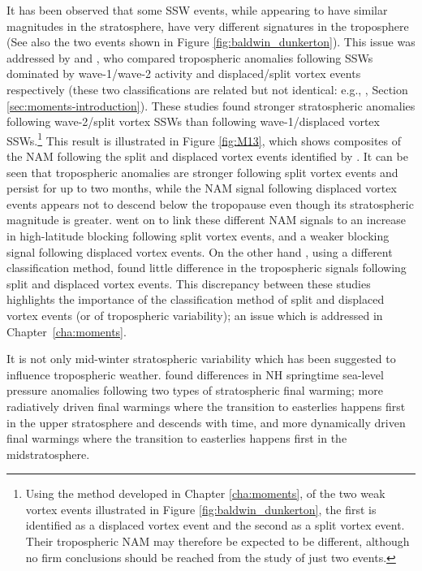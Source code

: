 It has been observed that some SSW events, while appearing to have similar
magnitudes in the stratosphere, have very different signatures in the
troposphere \citep[e.g.,][]{Baldwin2001a,Tomassini2012} (See also the two events
shown in Figure \ref{fig:baldwin_dunkerton}). This issue was addressed by
\citet{Nakagawa2006} and \citet{Mitchell2013}, who compared tropospheric
anomalies following SSWs dominated by wave-1/wave-2 activity and displaced/split
vortex events respectively (these two classifications are related but not
identical: e.g., \citet{Waugh1997}, Section
\ref{sec:moments-introduction}). These studies found stronger stratospheric
anomalies following wave-2/split vortex SSWs than following wave-1/displaced
vortex SSWs.\footnote{Using the method developed in Chapter \ref{cha:moments},
  of the two weak vortex events illustrated in Figure
  \ref{fig:baldwin_dunkerton}, the first is identified as a displaced vortex
  event and the second as a split vortex event. Their tropospheric NAM may
  therefore be expected to be different, although no firm conclusions should be
  reached from the study of just two events.} This result is illustrated in
Figure \ref{fig:M13}, which shows composites of the NAM following the split and
displaced vortex events identified by \citet{Mitchell2013}. It can be seen that
tropospheric anomalies are stronger following split vortex events and persist
for up to two months, while the NAM signal following displaced vortex events
appears not to descend below the tropopause even though its stratospheric
magnitude is greater. \citet{Mitchell2013} went on to link these different NAM
signals to an increase in high-latitude blocking following split vortex events,
and a weaker blocking signal following displaced vortex events. On the other
hand \citet{Charlton2007}, using a different classification method, found little
difference in the tropospheric signals following split and displaced vortex
events. This discrepancy between these studies highlights the importance of the
classification method of split and displaced vortex events (or of tropospheric
variability); an issue which is addressed in Chapter~\ref{cha:moments}.

It is not only mid-winter stratospheric variability which has been suggested to
influence tropospheric weather. \citet{Hardiman2011} found differences
in NH springtime sea-level pressure anomalies following two types of
stratospheric final warming; more radiatively driven final warmings where the
transition to easterlies happens first in the upper stratosphere and descends
with time, and more dynamically driven final warmings where the transition to
easterlies happens first in the midstratosphere.  

